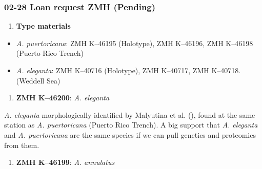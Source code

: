 \documentclass[
  man,
  longtable,
  nolmodern,
  notxfonts,
  notimes,
  colorlinks=true,linkcolor=blue,citecolor=blue,urlcolor=blue]{apa7}
\providecommand{\tightlist}{%
  \setlength{\itemsep}{0pt}\setlength{\parskip}{0pt}}
\begin{document}
\subsubsection{02-28 \textbar{} Loan request ZMH
(Pending)}\label{loan-request-zmh-pending}

\begin{enumerate}
\def\labelenumi{\arabic{enumi}.}
\tightlist
\item
  \textbf{Type materials}
\end{enumerate}

\begin{itemize}
\tightlist
\item
  \emph{A. puertoricana}: ZMH K--46195 (Holotype), ZMH K--46196, ZMH
  K--46198 (Puerto Rico Trench)
\item
  \emph{A. eleganta}: ZMH K--40716 (Holotype), ZMH K--40717, ZMH
  K--40718. (Weddell Sea)
\end{itemize}

\begin{enumerate}
\def\labelenumi{\arabic{enumi}.}
\setcounter{enumi}{1}
\tightlist
\item
  \textbf{ZMH K--46200}: \emph{A. eleganta}
\end{enumerate}

\emph{A. eleganta} morphologically identified by Malyutina et al.
(), found at the same station as
\emph{A. puertoricana} (Puerto Rico Trench). A big support that \emph{A.
eleganta} and \emph{A. puertoricana} are the same species if we can pull
genetics and proteomics from them.

\begin{enumerate}
\def\labelenumi{\arabic{enumi}.}
\setcounter{enumi}{2}
\tightlist
\item
  \textbf{ZMH K--46199}: \emph{A. annulatus}
\end{enumerate}
\end{document}
